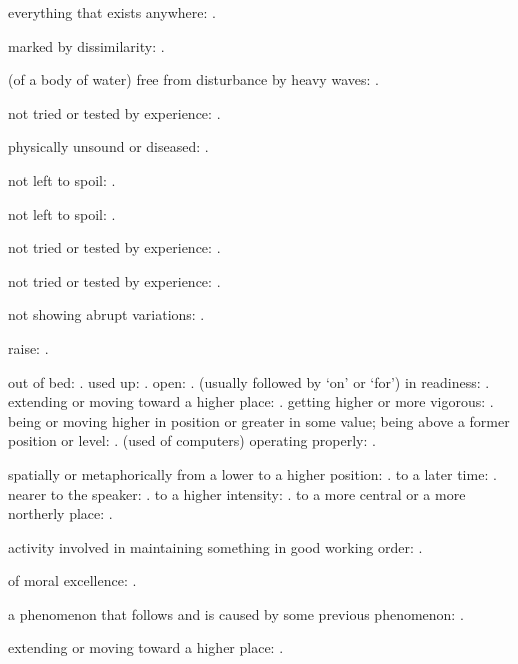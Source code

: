   everything that exists anywhere: .

  marked by dissimilarity: .

  (of a body of water) free from disturbance by heavy waves: .

  not tried or tested by experience: .

  physically unsound or diseased: .

  not left to spoil: .

  not left to spoil: .

  not tried or tested by experience: .

  not tried or tested by experience: .

  not showing abrupt variations: .

  raise: .

  out of bed: . used up: . open: . (usually followed by `on' or `for') in readiness: . extending or moving toward a higher place: . getting higher or more vigorous: . being or moving higher in position or greater in some value; being above a former position or level: . (used of computers) operating properly: .

  spatially or metaphorically from a lower to a higher position: . to a later time: . nearer to the speaker: . to a higher intensity: . to a more central or a more northerly place: .

  activity involved in maintaining something in good working order: .

  of moral excellence: .

  a phenomenon that follows and is caused by some previous phenomenon: .

  extending or moving toward a higher place: .

